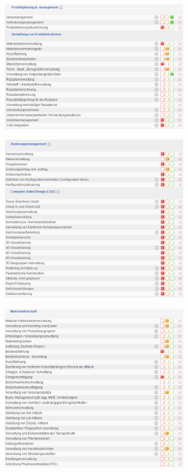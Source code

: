 \documentclass[12pt]{article}
\begin{document}
\noindent
\begin{figure}[!h]
\centering
\includegraphics[width=0.7\textwidth]{images/tr17}
\end{figure}\FloatBarrier
\noindent
\begin{figure}[!h]
\centering
\includegraphics[width=0.7\textwidth]{images/tr18}
\end{figure}\FloatBarrier
\noindent
\begin{figure}[!h]
\centering
\includegraphics[width=0.7\textwidth]{images/tr19}
\end{figure}\FloatBarrier
\end{document}
